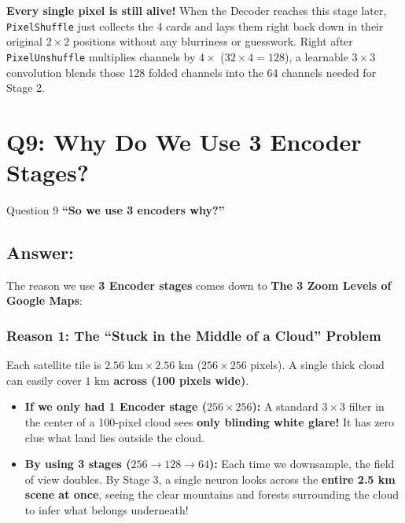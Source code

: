 \documentclass[11pt,a4paper]{article}
\begin{document}
\textbf{Every single pixel is still alive!} When the Decoder reaches this stage later, \texttt{PixelShuffle} just collects the 4 cards and lays them right back down in their original $2\times 2$ positions without any blurriness or guesswork. Right after \texttt{PixelUnshuffle} multiplies channels by $4\times$ ($32 \times 4 = 128$), a learnable $3\times 3$ convolution blends those 128 folded channels into the 64 channels needed for Stage 2.

\bigskip

\section{Q9: Why Do We Use 3 Encoder Stages?}

\begin{questionbox}{Question 9}
\textbf{``So we use 3 encoders why?''}
\end{questionbox}

\subsection*{Answer:}
The reason we use \textbf{3 Encoder stages} comes down to \textbf{The 3 Zoom Levels of Google Maps}:

\subsubsection*{Reason 1: The ``Stuck in the Middle of a Cloud'' Problem}
Each satellite tile is $2.56\text{ km} \times 2.56\text{ km}$ ($256 \times 256$ pixels). A single thick cloud can easily cover \textbf{$1\text{ km}$ across (100 pixels wide)}.
\begin{itemize}[leftmargin=1.5em]
    \item \textbf{If we only had 1 Encoder stage ($256 \times 256$):} A standard $3\times 3$ filter in the center of a 100-pixel cloud sees \textbf{only blinding white glare!} It has zero clue what land lies outside the cloud.
    \item \textbf{By using 3 stages ($256 \to 128 \to 64$):} Each time we downsample, the field of view doubles. By Stage 3, a single neuron looks across the \textbf{entire 2.5 km scene at once}, seeing the clear mountains and forests surrounding the cloud to infer what belongs underneath!
\end{itemize}
\end{document}
